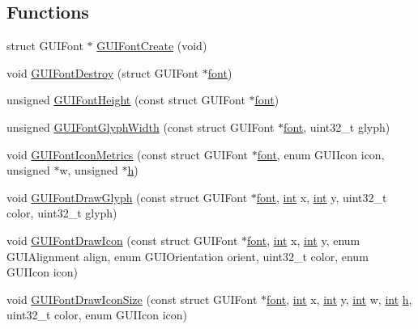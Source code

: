 \subsection*{Functions}
\begin{DoxyCompactItemize}
\item 
struct G\+U\+I\+Font $\ast$ \mbox{\hyperlink{psp2_2gui-font_8c_afeda865aa70118eb5e13639aeea185e5}{G\+U\+I\+Font\+Create}} (void)
\item 
void \mbox{\hyperlink{psp2_2gui-font_8c_aa30d3bddfd055be2a203306973eb2b6a}{G\+U\+I\+Font\+Destroy}} (struct G\+U\+I\+Font $\ast$\mbox{\hyperlink{wii_2main_8c_adae3f41cbe0ea5e886715661bb739691}{font}})
\item 
unsigned \mbox{\hyperlink{psp2_2gui-font_8c_a6d539c7b23450b8918bb6499e2c11042}{G\+U\+I\+Font\+Height}} (const struct G\+U\+I\+Font $\ast$\mbox{\hyperlink{wii_2main_8c_adae3f41cbe0ea5e886715661bb739691}{font}})
\item 
unsigned \mbox{\hyperlink{psp2_2gui-font_8c_a4b38c72440f93dd3f4c6d01848a23203}{G\+U\+I\+Font\+Glyph\+Width}} (const struct G\+U\+I\+Font $\ast$\mbox{\hyperlink{wii_2main_8c_adae3f41cbe0ea5e886715661bb739691}{font}}, uint32\+\_\+t glyph)
\item 
void \mbox{\hyperlink{psp2_2gui-font_8c_a70534a7637eda192a15884d8930a61b8}{G\+U\+I\+Font\+Icon\+Metrics}} (const struct G\+U\+I\+Font $\ast$\mbox{\hyperlink{wii_2main_8c_adae3f41cbe0ea5e886715661bb739691}{font}}, enum G\+U\+I\+Icon icon, unsigned $\ast$w, unsigned $\ast$\mbox{\hyperlink{isa-lr35902_8c_a06a62682361411df32cf88f75a0b8da4}{h}})
\item 
void \mbox{\hyperlink{psp2_2gui-font_8c_a7be283f1f320dc6308f9bc4ac24c4da7}{G\+U\+I\+Font\+Draw\+Glyph}} (const struct G\+U\+I\+Font $\ast$\mbox{\hyperlink{wii_2main_8c_adae3f41cbe0ea5e886715661bb739691}{font}}, \mbox{\hyperlink{ioapi_8h_a787fa3cf048117ba7123753c1e74fcd6}{int}} x, \mbox{\hyperlink{ioapi_8h_a787fa3cf048117ba7123753c1e74fcd6}{int}} y, uint32\+\_\+t color, uint32\+\_\+t glyph)
\item 
void \mbox{\hyperlink{psp2_2gui-font_8c_a89adf10a0ec4d3b2dfba92b95ab17ad5}{G\+U\+I\+Font\+Draw\+Icon}} (const struct G\+U\+I\+Font $\ast$\mbox{\hyperlink{wii_2main_8c_adae3f41cbe0ea5e886715661bb739691}{font}}, \mbox{\hyperlink{ioapi_8h_a787fa3cf048117ba7123753c1e74fcd6}{int}} x, \mbox{\hyperlink{ioapi_8h_a787fa3cf048117ba7123753c1e74fcd6}{int}} y, enum G\+U\+I\+Alignment align, enum G\+U\+I\+Orientation orient, uint32\+\_\+t color, enum G\+U\+I\+Icon icon)
\item 
void \mbox{\hyperlink{psp2_2gui-font_8c_ae9ac7ef646aad8e77b04baf500472178}{G\+U\+I\+Font\+Draw\+Icon\+Size}} (const struct G\+U\+I\+Font $\ast$\mbox{\hyperlink{wii_2main_8c_adae3f41cbe0ea5e886715661bb739691}{font}}, \mbox{\hyperlink{ioapi_8h_a787fa3cf048117ba7123753c1e74fcd6}{int}} x, \mbox{\hyperlink{ioapi_8h_a787fa3cf048117ba7123753c1e74fcd6}{int}} y, \mbox{\hyperlink{ioapi_8h_a787fa3cf048117ba7123753c1e74fcd6}{int}} w, \mbox{\hyperlink{ioapi_8h_a787fa3cf048117ba7123753c1e74fcd6}{int}} \mbox{\hyperlink{isa-lr35902_8c_a06a62682361411df32cf88f75a0b8da4}{h}}, uint32\+\_\+t color, enum G\+U\+I\+Icon icon)
\end{DoxyCompactItemize}
